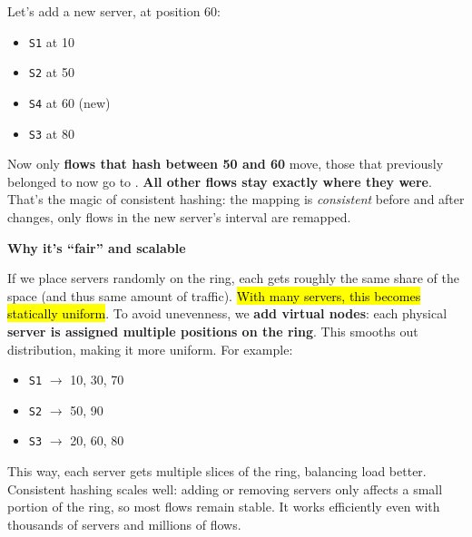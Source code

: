 \begin{examplebox}
    Let's add a new server,  at position 60:
    \begin{itemize}
        \item \texttt{S1} at 10
        \item \texttt{S2} at 50
        \item \texttt{S4} at 60 (new)
        \item \texttt{S3} at 80
    \end{itemize}
    Now only \textbf{flows that hash between 50 and 60} move, those that previously belonged to  now go to . \textbf{All other flows stay exactly where they were}. That's the magic of consistent hashing: the mapping is \emph{consistent} before and after changes, only flows in the new server's interval are remapped.
\end{examplebox}

\begin{flushleft}
    \textcolor{Green3}{ \textbf{Why it's ``fair'' and scalable}}
\end{flushleft}
If we place servers randomly on the ring, each gets roughly the same share of the space (and thus same amount of traffic). \hl{With many servers, this becomes statically uniform}. To avoid unevenness, we \textbf{add virtual nodes}: each physical \textbf{server is assigned multiple positions on the ring}. This smooths out distribution, making it more uniform. For example:
\begin{itemize}
    \item \texttt{S1} $\rightarrow$ 10, 30, 70
    \item \texttt{S2} $\rightarrow$ 50, 90
    \item \texttt{S3} $\rightarrow$ 20, 60, 80
\end{itemize}
This way, each server gets multiple slices of the ring, balancing load better. Consistent hashing scales well: adding or removing servers only affects a small portion of the ring, so most flows remain stable. It works efficiently even with thousands of servers and millions of flows.

\newpage

